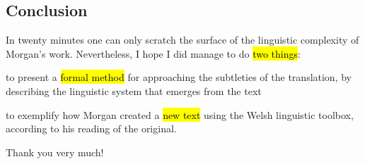 \begin{paper}
	\section{Conclusion}

	In twenty minutes one can only scratch the surface of the linguistic complexity of Morgan’s work. Nevertheless, I hope I did manage to do \hl{two things}:
	\begin{compactitem}
		\item to present a \hl{formal method} for approaching the subtleties of the translation, by describing the linguistic system that emerges from the text
		\item to exemplify how Morgan created a \hl{new text} using the Welsh linguistic toolbox, according to his reading of the original.
	\end{compactitem}

	Thank you very much!
\end{paper}
